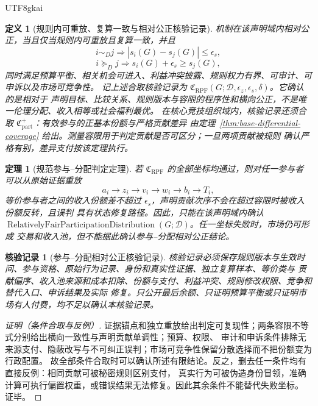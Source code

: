 \documentclass[12pt,a4paper,openany]{report}
\newtheorem{definition}{定义}[chapter]
\newtheorem{theorem}{定理}[chapter]
\newtheorem{Certificate}{核验记录}[chapter]
\begin{document}
\begin{CJK*}{UTF8}{gkai}
\begin{definition}[规则内可重放、复算一致与相对公正核验记录]
机制在该声明域内相对公正，当且仅当规则内可重放且复算一致，并且
\[
  i\sim_Dj\Longrightarrow |s_i(G)-s_j(G)|\le\epsilon_s,
\]
\[
  i\succeq_Dj\Longrightarrow s_i(G)+\epsilon_s\ge s_j(G),
\]
同时满足预算平衡、相关机会可进入、利益冲突披露、规则权力有界、可审计、可申诉以及市场可竞争性。
记上述合取核验记录为 \(\mathfrak C_{\mathrm{RPF}}(G;\mathcal D,\epsilon_z,\epsilon_s,\delta)\)。它确认的是相对于
声明目标、比较关系、规则版本与容限的程序性和横向公正，不是唯一伦理分配、收入相等或社会福利最优。
在核心竞技组织域内，核验记录还须合取 \(\mathfrak C_{\mathrm{part}}^+\)：有效参与的正基本份额与严格贡献差异
由定理~\ref{thm:base-differential-coverage} 给出。测量容限用于判定贡献是否可区分；一旦两项贡献被规则
确认严格有别，差异支付按该定理执行。
\end{definition}

\begin{theorem}[规范参与--分配判定定理]
\label{thm:relative-participation-fairness}
若 \(\mathfrak C_{\mathrm{RPF}}\) 的全部坐标均通过，则对任一参与者可以从原始证据重放
\[
  a_i\to z_i\to v_i\to w_i\to b_i\to T_i,
\]
等价参与者之间的收入份额差不超过 \(\epsilon_s\)，声明贡献次序不会在超过容限时被收入份额反转，且误判
具有状态修复路径。因此，只能在该声明域内确认
\(\operatorname{RelativelyFairParticipationDistribution}(G;\mathcal D)\)。任一坐标失败时，市场仍可形成
交易和收入池，但不能据此确认参与--分配相对公正结论。
\end{theorem}

\begin{Certificate}[参与--分配相对公正核验记录]
核验记录必须保存规则版本与生效时间、参与资格、原始行为记录、身份和真实性证据、独立复算样本、等价类与
贡献偏序、收入池来源和成本扣除、份额与支付、利益冲突、规则修改权限、竞争和替代入口、申诉结果及实际
修复。只公开最后余额、只证明预算平衡或只证明市场有人付费，均不足以确认本核验记录。
\end{Certificate}

\begin{proof}[证明（条件合取与反例）]
证据锚点和独立重放给出判定可复现性；两条容限不等式分别给出横向一致性与声明贡献单调性；预算、权限、
审计和申诉条件排除无来源支付、隐蔽改写与不可纠正误判；市场可竞争性保留分散选择而不把份额变为行政配置。
故全部条件合取时可以确认所述有限结论。反之，删去任一条件均有直接反例：相同贡献可被秘密规则区别支付，
真实行为可被伪造身份冒领，准确计算可执行偏置权重，或错误结果无法修复。因此其余条件不能替代失败坐标。
证毕。
\end{proof}


\end{CJK*}
\end{document}
